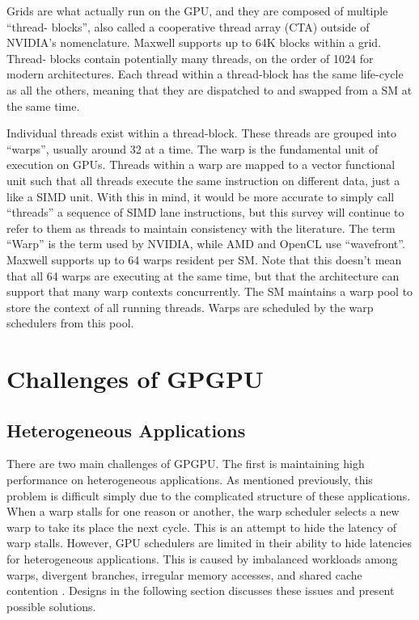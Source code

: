 \documentclass[prodmode,acmtecs]{acmsmall} %
\begin{document}
Grids are what actually run on the GPU, and they are composed of multiple
``thread- blocks'', also called a cooperative thread array (CTA) outside of
NVIDIA's nomenclature. Maxwell supports up to 64K blocks within a grid. Thread-
blocks contain potentially many threads, on the order of 1024 for modern
architectures. Each thread within a thread-block has the same life-cycle as all
the others, meaning that they are dispatched to and swapped from a SM at the
same time.

Individual threads exist within a thread-block. These threads are grouped into
``warps'', usually around 32 at a time. The warp is the fundamental unit of
execution on GPUs. Threads within a warp are mapped to a vector functional unit
such that all threads execute the same instruction on different data, just a
like a SIMD unit. With this in mind, it would be more accurate to simply call
``threads'' a sequence of SIMD lane instructions, but this survey will continue
to refer to them as threads to maintain consistency with the literature. The
term ``Warp'' is the term used by NVIDIA, while AMD and OpenCL use
``wavefront''. Maxwell supports up to 64 warps resident per SM. Note that this
doesn't mean that all 64 warps are executing at the same time, but that the
architecture can support that many warp contexts concurrently. The SM maintains
a warp pool to store the context of all running threads. Warps are scheduled by
the warp schedulers from this pool.

\section{Challenges of GPGPU} \label{sec:challenges}
\subsection{Heterogeneous Applications}
There are two main challenges of GPGPU. The first is maintaining high
performance on heterogeneous applications. As mentioned previously, this problem
is difficult simply due to the complicated structure of these applications. When
a warp stalls for one reason or another, the warp scheduler selects a new warp
to take its place the next cycle. This is an attempt to hide the latency of warp
stalls. However, GPU schedulers are limited in their ability to hide latencies
for heterogeneous applications. This is caused by imbalanced workloads among
warps, divergent branches, irregular memory accesses, and shared cache
contention \cite{CoordinatedWarpScheduling}. Designs in the following section
discusses these issues and present possible solutions.
\end{document}
